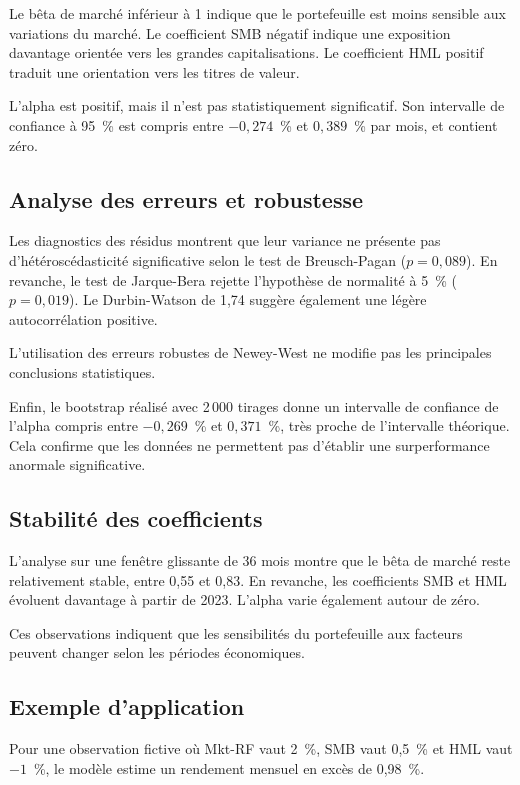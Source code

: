 \documentclass[12pt,a4paper]{article}
\begin{document}
Le bêta de marché inférieur à 1 indique que le portefeuille est moins sensible aux variations du marché. Le coefficient SMB négatif indique une exposition davantage orientée vers les grandes capitalisations. Le coefficient HML positif traduit une orientation vers les titres de valeur.

L'alpha est positif, mais il n'est pas statistiquement significatif. Son intervalle de confiance à 95~\% est compris entre $-0{,}274$~\% et $0{,}389$~\% par mois, et contient zéro.

\subsection{Analyse des erreurs et robustesse}

Les diagnostics des résidus montrent que leur variance ne présente pas d'hétéroscédasticité significative selon le test de Breusch-Pagan ($p = 0{,}089$). En revanche, le test de Jarque-Bera rejette l'hypothèse de normalité à 5~\% ($p = 0{,}019$). Le Durbin-Watson de 1,74 suggère également une légère autocorrélation positive.

L'utilisation des erreurs robustes de Newey-West ne modifie pas les principales conclusions statistiques.

Enfin, le bootstrap réalisé avec 2\,000 tirages donne un intervalle de confiance de l'alpha compris entre $-0{,}269$~\% et $0{,}371$~\%, très proche de l'intervalle théorique. Cela confirme que les données ne permettent pas d'établir une surperformance anormale significative.

\subsection{Stabilité des coefficients}

L'analyse sur une fenêtre glissante de 36 mois montre que le bêta de marché reste relativement stable, entre 0,55 et 0,83. En revanche, les coefficients SMB et HML évoluent davantage à partir de 2023. L'alpha varie également autour de zéro.

Ces observations indiquent que les sensibilités du portefeuille aux facteurs peuvent changer selon les périodes économiques.

\subsection{Exemple d'application}

Pour une observation fictive où Mkt-RF vaut 2~\%, SMB vaut 0,5~\% et HML vaut $-1$~\%, le modèle estime un rendement mensuel en excès de 0,98~\%.
\end{document}
